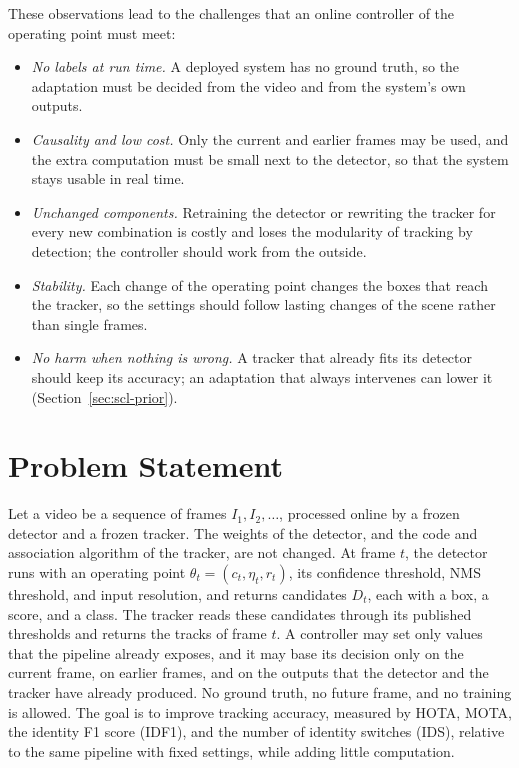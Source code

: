 These observations lead to the challenges that an online controller of the operating point must meet:
\begin{itemize}
\item \emph{No labels at run time.} A deployed system has no ground truth, so the adaptation must be decided from the video and from the system's own outputs.
\item \emph{Causality and low cost.} Only the current and earlier frames may be used, and the extra computation must be small next to the detector, so that the system stays usable in real time.
\item \emph{Unchanged components.} Retraining the detector or rewriting the tracker for every new combination is costly and loses the modularity of tracking by detection; the controller should work from the outside.
\item \emph{Stability.} Each change of the operating point changes the boxes that reach the tracker, so the settings should follow lasting changes of the scene rather than single frames.
\item \emph{No harm when nothing is wrong.} A tracker that already fits its detector should keep its accuracy; an adaptation that always intervenes can lower it (Section~\ref{sec:scl-prior}).
\end{itemize}

\section{Problem Statement}\label{sec:intro-problem}
Let a video be a sequence of frames $I_1, I_2, \dots$, processed online by a frozen detector and a frozen tracker. The weights of the detector, and the code and association algorithm of the tracker, are not changed. At frame $t$, the detector runs with an operating point $\theta_t=(c_t,\eta_t,r_t)$, its confidence threshold, NMS threshold, and input resolution, and returns candidates $D_t$, each with a box, a score, and a class. The tracker reads these candidates through its published thresholds and returns the tracks of frame $t$. A controller may set only values that the pipeline already exposes, and it may base its decision only on the current frame, on earlier frames, and on the outputs that the detector and the tracker have already produced. No ground truth, no future frame, and no training is allowed. The goal is to improve tracking accuracy, measured by HOTA, MOTA, the identity F1 score (IDF1), and the number of identity switches (IDS), relative to the same pipeline with fixed settings, while adding little computation.

